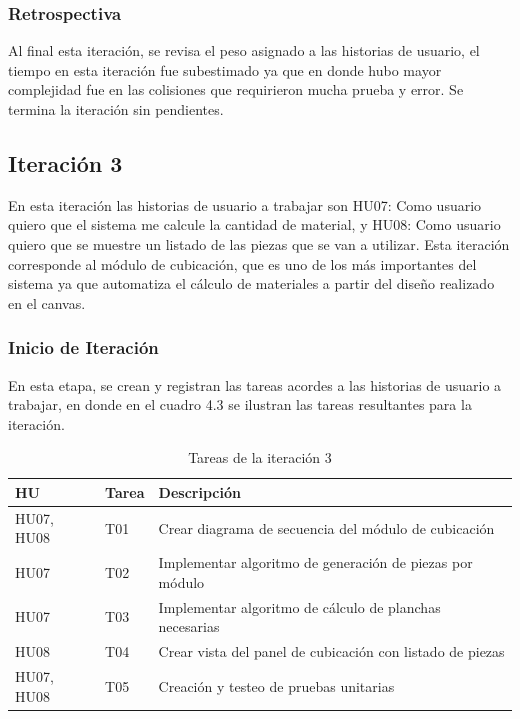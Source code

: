 ﻿\documentclass{iccmemoria}
\begin{document}
\subsubsection{Retrospectiva}
Al final esta iteración, se revisa el peso asignado a las historias de usuario, el tiempo en esta iteración fue subestimado ya que en donde hubo mayor complejidad fue en las colisiones que requirieron mucha prueba y error. Se termina la iteración sin pendientes.

\subsection{Iteración 3}
En esta iteración las historias de usuario a trabajar son HU07: Como usuario quiero que el sistema me calcule la cantidad de material, y HU08: Como usuario quiero que se muestre un listado de las piezas que se van a utilizar. Esta iteración corresponde al módulo de cubicación, que es uno de los más importantes del sistema ya que automatiza el cálculo de materiales a partir del diseño realizado en el canvas.

\subsubsection{Inicio de Iteración}
En esta etapa, se crean y registran las tareas acordes a las historias de usuario a trabajar, en donde en el cuadro 4.3 se ilustran las tareas resultantes para la iteración.

\begin{table}[H]
    \centering
    \caption{Tareas de la iteración 3}
    \label{tab:tareas_iteracion3}
    \begin{tabular}{|p{2cm}|p{2cm}|p{7cm}|}
        \hline
        \textbf{HU} & \textbf{Tarea} & \textbf{Descripción}\\
        \hline
HU07, HU08 & T01 & Crear diagrama de secuencia del módulo de cubicación\\
\hline
HU07 & T02 & Implementar algoritmo de generación de piezas por módulo\\
\hline
HU07 & T03 & Implementar algoritmo de cálculo de planchas necesarias\\
\hline
HU08 & T04 & Crear vista del panel de cubicación con listado de piezas\\
\hline
HU07, HU08 & T05 & Creación y testeo de pruebas unitarias\\
        \hline
    \end{tabular}
\end{table}
\end{document}
